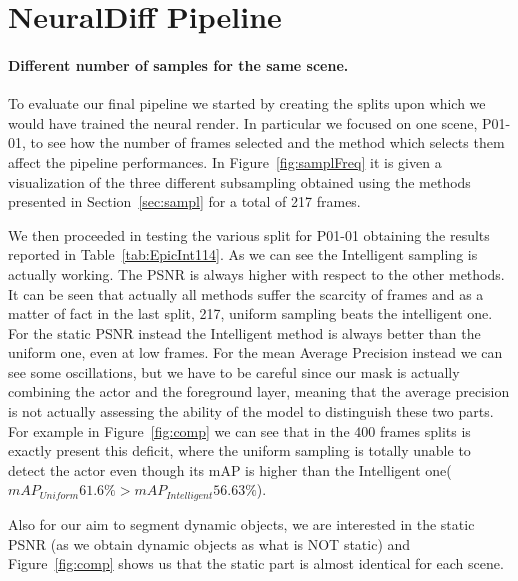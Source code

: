 \section{NeuralDiff Pipeline}
\paragraph{Different number of samples for the same scene.}
To evaluate our final pipeline we started by creating the splits upon which we would have trained the neural render.
In particular we focused on one scene, P01-01, to see how the number of frames selected and the method which 
selects them affect the pipeline performances.
In Figure~\ref{fig:samplFreq} it is given a visualization of the three different subsampling obtained using the methods presented
in Section~\ref{sec:sampl} for a total of 217 frames.

We then proceeded in testing the various split for P01-01 obtaining the results reported in Table~\ref{tab:EpicInt114}.
As we can see the Intelligent sampling is actually working. The PSNR is always higher with respect to the other methods.
It can be seen that actually all methods suffer the scarcity of frames and as a matter of fact in the last split, 217, 
uniform sampling beats the intelligent one. For the static PSNR instead the Intelligent method is always better
than the uniform one, even at low frames. For the mean Average Precision instead we can see some oscillations,
but we have to be careful since our mask is actually combining the actor and the foreground layer, meaning that 
the average precision is not actually assessing the ability of the model to distinguish these two parts. 
For example in Figure~\ref{fig:comp} we can see that in the 400 frames splits is exactly present this deficit, where the 
uniform sampling is totally unable to detect the actor even though its mAP is higher than the Intelligent 
one($mAP_{Uniform}61.6\% > mAP_{Intelligent}56.63\%$).

Also for our aim to segment dynamic objects, we are interested in the static PSNR (as we obtain dynamic objects as 
what is NOT static) and Figure~\ref{fig:comp} shows us that the static part is almost identical for each scene.




